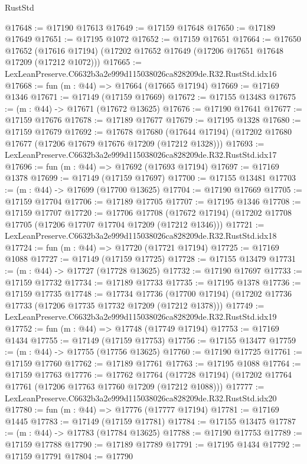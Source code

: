 \begin{lexlean}{RustStd}
\begin{coremodule}
@17648 := @17190 @17613
@17649 := @17159 @17648
@17650 := @17189 @17649
@17651 := @17195 @1072
@17652 := @17159 @17651
@17664 := @17650
    @17652
    (@17616 @17194)
    (@17202 @17652 @17649 (@17206 @17651 @17648 @17209 (@17212 @1072)))
@17665 := LexLeanPreserve.C6632b3a2e999d115038026ca828209de.R32.RustStd.idx16
@17668 := fun (m : @44) => @17664 (@17665 @17194)
@17669 := @17169 @1346
@17671 := @17149 (@17159 @17669)
@17672 := @17155 @13483
@17675 := (m : @44) -> @17671 (@17672 @13625)
@17676 := @17190 @17641
@17677 := @17159 @17676
@17678 := @17189 @17677
@17679 := @17195 @1328
@17680 := @17159 @17679
@17692 := @17678
    @17680
    (@17644 @17194)
    (@17202 @17680 @17677 (@17206 @17679 @17676 @17209 (@17212 @1328)))
@17693 := LexLeanPreserve.C6632b3a2e999d115038026ca828209de.R32.RustStd.idx17
@17696 := fun (m : @44) => @17692 (@17693 @17194)
@17697 := @17169 @1378
@17699 := @17149 (@17159 @17697)
@17700 := @17155 @13481
@17703 := (m : @44) -> @17699 (@17700 @13625)
@17704 := @17190 @17669
@17705 := @17159 @17704
@17706 := @17189 @17705
@17707 := @17195 @1346
@17708 := @17159 @17707
@17720 := @17706
    @17708
    (@17672 @17194)
    (@17202 @17708 @17705 (@17206 @17707 @17704 @17209 (@17212 @1346)))
@17721 := LexLeanPreserve.C6632b3a2e999d115038026ca828209de.R32.RustStd.idx18
@17724 := fun (m : @44) => @17720 (@17721 @17194)
@17725 := @17169 @1088
@17727 := @17149 (@17159 @17725)
@17728 := @17155 @13479
@17731 := (m : @44) -> @17727 (@17728 @13625)
@17732 := @17190 @17697
@17733 := @17159 @17732
@17734 := @17189 @17733
@17735 := @17195 @1378
@17736 := @17159 @17735
@17748 := @17734
    @17736
    (@17700 @17194)
    (@17202 @17736 @17733 (@17206 @17735 @17732 @17209 (@17212 @1378)))
@17749 := LexLeanPreserve.C6632b3a2e999d115038026ca828209de.R32.RustStd.idx19
@17752 := fun (m : @44) => @17748 (@17749 @17194)
@17753 := @17169 @1434
@17755 := @17149 (@17159 @17753)
@17756 := @17155 @13477
@17759 := (m : @44) -> @17755 (@17756 @13625)
@17760 := @17190 @17725
@17761 := @17159 @17760
@17762 := @17189 @17761
@17763 := @17195 @1088
@17764 := @17159 @17763
@17776 := @17762
    @17764
    (@17728 @17194)
    (@17202 @17764 @17761 (@17206 @17763 @17760 @17209 (@17212 @1088)))
@17777 := LexLeanPreserve.C6632b3a2e999d115038026ca828209de.R32.RustStd.idx20
@17780 := fun (m : @44) => @17776 (@17777 @17194)
@17781 := @17169 @1445
@17783 := @17149 (@17159 @17781)
@17784 := @17155 @13475
@17787 := (m : @44) -> @17783 (@17784 @13625)
@17788 := @17190 @17753
@17789 := @17159 @17788
@17790 := @17189 @17789
@17791 := @17195 @1434
@17792 := @17159 @17791
@17804 := @17790

\end{coremodule}
\end{lexlean}
